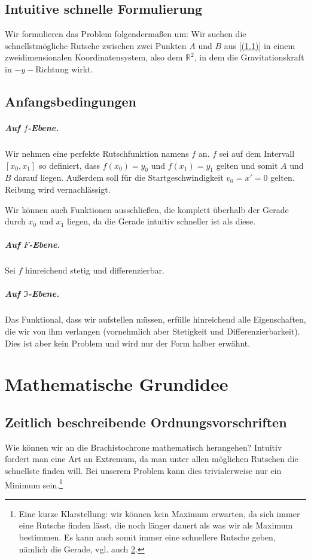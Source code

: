 \section{Intuitive schnelle Formulierung}
 Wir formulieren das Problem folgendermaßen um:
Wir suchen die schnellstmögliche Rutsche zwischen zwei Punkten $A$ und $B$ aus \ref{(1.1)} in einem zweidimensionalen Koordinatensystem, also dem $\mathbb{R}^2$, in dem die Gravitationskraft in $-y-$Richtung wirkt.

 \section{Anfangsbedingungen} \label{anfang}
 \paragraph{Auf $f$-Ebene.} \label{anfangsf}
 Wir nehmen eine perfekte Rutschfunktion namens $f$ an. $f$ sei auf dem Intervall $\left[x_0,x_1 \right]$ so definiert, dass $f(x_0)=y_0$ und $f(x_1)=y_1$ gelten und somit $A$ und $B$ darauf liegen.
 Außerdem soll für die Startgeschwindigkeit $v_0=x'=0$ gelten. 
 Reibung wird vernachlässigt.

Wir können auch Funktionen ausschließen, die komplett überhalb der Gerade durch $x_0$ und $x_1$ liegen, da die Gerade intuitiv schneller ist als diese. 
 
 \paragraph{Auf $F$-Ebene.}
 Sei $f$ hinreichend stetig und differenzierbar. 
 
 \paragraph{Auf $\mathfrak{I}$-Ebene.}
 Das Funktional, dass wir aufstellen müssen, erfülle hinreichend alle Eigenschaften, die wir von ihm verlangen (vornehmlich aber Stetigkeit und Differenzierbarkeit). Dies ist aber kein Problem und wird nur der Form halber erwähnt.


\chapter{Mathematische Grundidee}

\section{Zeitlich beschreibende Ordnungsvorschriften}
Wie können wir an die Brachistochrone mathematisch herangehen? Intuitiv fordert man eine Art an Extremum, da man unter allen möglichen Rutschen die schnellste finden will. Bei unserem Problem kann dies trivialerweise nur ein Minimum sein.\footnote{Eine kurze Klarstellung: wir können kein Maximum erwarten, da sich immer eine Rutsche finden lässt, die noch länger dauert als was wir als Maximum bestimmen. Es kann auch somit immer eine schnellere Rutsche geben, nämlich die Gerade, vgl. auch \ref{anfang}.}

